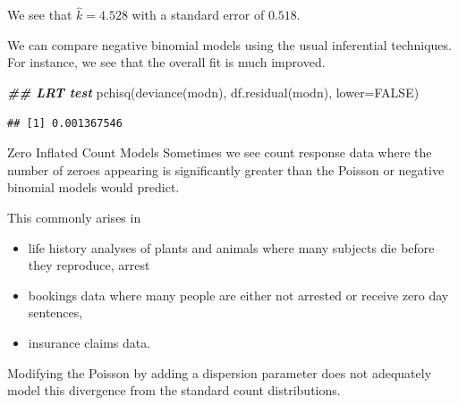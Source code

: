 \documentclass[
  ignorenonframetext,
]{beamer}
\newenvironment{Shaded}{\begin{snugshade}}{\end{snugshade}}
\newcommand{\AttributeTok}[1]{\textcolor[rgb]{0.77,0.63,0.00}{#1}}
\newcommand{\ConstantTok}[1]{\textcolor[rgb]{0.00,0.00,0.00}{#1}}
\newcommand{\DocumentationTok}[1]{\textcolor[rgb]{0.56,0.35,0.01}{\textbf{\textit{#1}}}}
\newcommand{\FunctionTok}[1]{\textcolor[rgb]{0.00,0.00,0.00}{#1}}
\newcommand{\NormalTok}[1]{#1}
\providecommand{\tightlist}{%
  \setlength{\itemsep}{0pt}\setlength{\parskip}{0pt}}
\begin{document}
\begin{frame}[fragile]{}
\protect\hypertarget{section-35}{}
We see that \(\hat k = 4.528\) with a standard error of \(0.518\).

\vspace{12pt}

We can compare negative binomial models using the usual inferential
techniques. For instance, we see that the overall fit is much improved.

\vspace{12pt}
\tiny

\begin{Shaded}
\begin{Highlighting}[]
\DocumentationTok{\#\# LRT test}
\FunctionTok{pchisq}\NormalTok{(}\FunctionTok{deviance}\NormalTok{(modn), }\FunctionTok{df.residual}\NormalTok{(modn), }\AttributeTok{lower=}\ConstantTok{FALSE}\NormalTok{)}
\end{Highlighting}
\end{Shaded}

\begin{verbatim}
## [1] 0.001367546
\end{verbatim}
\end{frame}

\begin{frame}{Zero Inflated Count Models}
\protect\hypertarget{zero-inflated-count-models}{}
Sometimes we see count response data where the number of zeroes
appearing is significantly greater than the Poisson or negative binomial
models would predict.

\vspace{12pt}

This commonly arises in

\begin{itemize}
\tightlist
\item
  life history analyses of plants and animals where many subjects die
  before they reproduce, arrest
\item
  bookings data where many people are either not arrested or receive
  zero day sentences,
\item
  insurance claims data.
\end{itemize}

\vspace{12pt}

Modifying the Poisson by adding a dispersion parameter does not
adequately model this divergence from the standard count distributions.
\end{frame}
\end{document}
